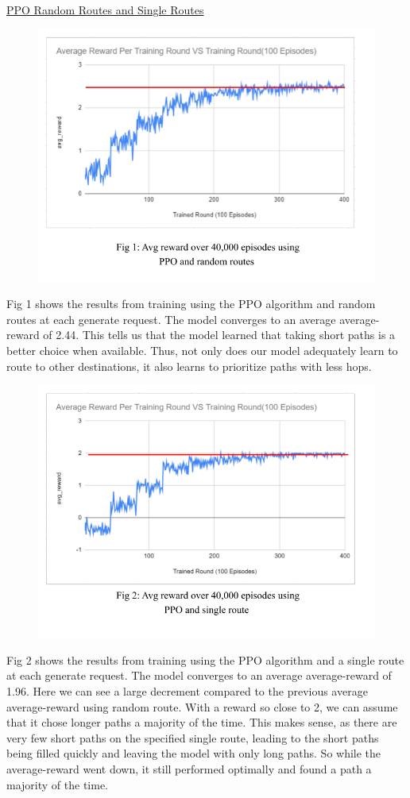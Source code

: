 \documentclass[conference]{IEEEtran}
\begin{document}
\begin{flushleft}

\underline{PPO Random Routes and Single Routes}
\begin{figure}[ht!]
    \includegraphics[width=.75\linewidth]{Final Paper Results And Graphs.png}
\end{figure}
\newline

Fig 1 shows the results from training using the PPO algorithm and random routes at each generate request. The model converges to an average average-reward of 2.44. This tells us that the model learned that taking short paths is a better choice when available. Thus, not only does our model adequately learn to route to other destinations, it also learns to prioritize paths with less hops.
\begin{figure}[ht!]
    \includegraphics[width=.75\linewidth]{Final Paper Results And Graphs (2).png}
\end{figure}
\newline

Fig 2 shows the results from training using the PPO algorithm and a single route at each generate request. The model converges to an average average-reward of 1.96. Here we can see a large decrement compared to the previous average average-reward using random route. With a reward so close to 2, we can assume that it chose longer paths a majority of the time. This makes sense, as there are very few short paths on the specified single route, leading to the short paths being filled quickly and leaving the model with only long paths. So while the average-reward went down, it still performed optimally and found a path a majority of the time.
\end{flushleft}
\end{document}
